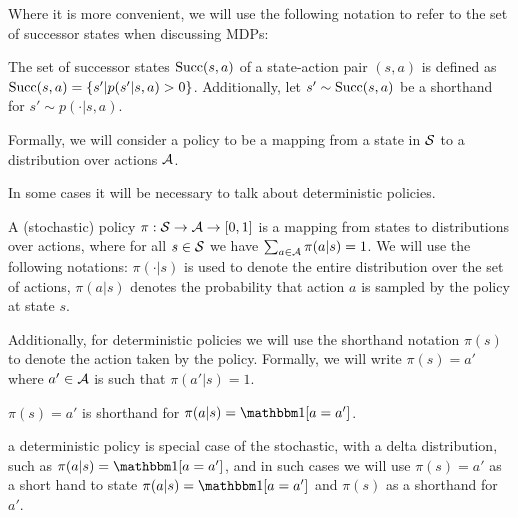     Where it is more convenient, we will use the following notation to refer to the set of successor states when discussing MDPs:
    \begin{defn}
        \label{def:succ}
        The set of \textnormal{successor states} $\textnormal{Succ}(s,a)$ of a state-action pair $(s,a)$ is defined as $\textnormal{Succ}(s,a)=\{s'|p(s'|s,a)>0\}$. Additionally, let $s'\sim \textnormal{Succ}(s,a)$ be a shorthand for $s'\sim p(\cdot|s,a)$.
    \end{defn}


    Formally, we will consider a policy to be a mapping from a state in $\mathcal{S}$ to a distribution over actions $\mathcal{A}$. 


    In some cases it will be necessary to talk about deterministic policies. 

    \begin{defn}
        \label{def:policy}
        A \textnormal{(stochastic) policy} $\pi:\mathcal{S}\rightarrow \mathcal{A} \rightarrow [0,1]$ is a mapping from states to distributions over actions, where for all $s \in \mathcal{S}$ we have $\sum_{a\in\mathcal{A}} \pi(a|s) = 1$. We will use the following notations: $\pi(\cdot|s)$ is used to denote the entire distribution over the set of actions, $\pi(a|s)$ denotes the probability that action $a$ is sampled by the policy at state $s$. 

        Additionally, for \textnormal{deterministic policies} we will use the shorthand notation $\pi(s)$ to denote the action taken by the policy. Formally, we will write $\pi(s)=a'$ where $a'\in\mathcal{A}$ is such that $\pi(a'|s)=1$.

         $\pi(s)=a'$ is shorthand for $\pi(a|s)=\one[a=a']$.

         a deterministic policy is special case of the stochastic, with a delta distribution, such as $\pi(a|s)=\one[a=a']$, and in such cases we will use $\pi(s)=a'$ as a short hand to state $\pi(a|s)=\one[a=a']$ and $\pi(s)$ as a shorthand for $a'$.
    \end{defn}

